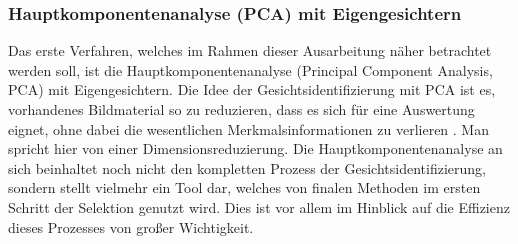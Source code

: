 \documentclass[doktyp=semarbeit, sprache=german]{TUBAFarbeiten}
\begin{document}
\subsubsection{Hauptkomponentenanalyse (PCA) mit Eigengesichtern}
Das erste Verfahren, welches im Rahmen dieser Ausarbeitung näher betrachtet werden soll, ist die Hauptkomponentenanalyse (Principal Component Analysis, PCA) mit Eigengesichtern. Die Idee der Gesichtsidentifizierung mit PCA ist es, vorhandenes Bildmaterial so zu reduzieren, dass es sich für eine Auswertung eignet, ohne dabei die wesentlichen Merkmalsinformationen zu verlieren \cite{PCANova}. Man spricht hier von einer Dimensionsreduzierung. Die Hauptkomponentenanalyse an sich beinhaltet noch nicht den kompletten Prozess der Gesichtsidentifizierung, sondern stellt vielmehr ein Tool dar, welches von finalen Methoden im ersten Schritt der Selektion genutzt wird. Dies ist vor allem im Hinblick auf die Effizienz dieses Prozesses von großer Wichtigkeit.
\end{document}
